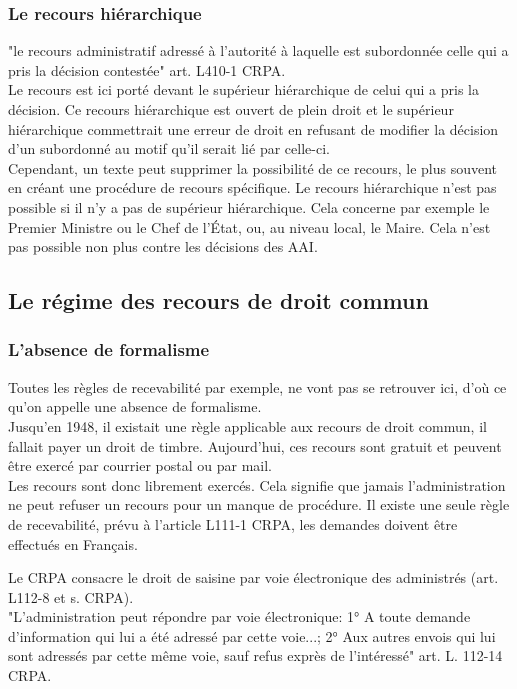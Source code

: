 \documentclass[10pt, a4paper, openany]{book}
\begin{document}
\subsubsection{Le recours hiérarchique}

"le recours administratif adressé à l'autorité à laquelle est subordonnée celle qui a pris la décision contestée" art. L410-1 CRPA. \\
Le recours est ici porté devant le supérieur hiérarchique de celui qui a pris la décision. Ce recours hiérarchique est ouvert de plein droit et le supérieur hiérarchique commettrait une erreur de droit en refusant de modifier la décision d'un subordonné au motif qu'il serait lié par celle-ci. \\
Cependant, un texte peut supprimer la possibilité de ce recours, le plus souvent en créant une procédure de recours spécifique. Le recours hiérarchique n'est pas possible si il n'y a pas de supérieur hiérarchique. Cela concerne par exemple le Premier Ministre ou le Chef de l'État, ou, au niveau local, le Maire. Cela n'est pas possible non plus contre les décisions des AAI. 

\subsection{Le régime des recours de droit commun}

\subsubsection{L'absence de formalisme}

Toutes les règles de recevabilité par exemple, ne vont pas se retrouver ici, d'où ce qu'on appelle une absence de formalisme. \\
Jusqu'en 1948, il existait une règle applicable aux recours de droit commun, il fallait payer un droit de timbre. Aujourd'hui, ces recours sont gratuit et peuvent être exercé par courrier postal ou par mail. \\
Les recours sont donc librement exercés. Cela signifie que jamais l'administration ne peut refuser un recours pour un manque de procédure. Il existe une seule règle de recevabilité, prévu à l'article L111-1 CRPA, les demandes doivent être effectués en Français.


Le CRPA consacre le droit de saisine par voie électronique des administrés (art. L112-8 et s. CRPA). \\
 "L'administration peut répondre par voie électronique: 1° A toute demande d'information qui lui a été adressé par cette voie...; 2° Aux autres envois qui lui sont adressés par cette même voie, sauf refus exprès de l'intéressé" art. L. 112-14 CRPA. 
\end{document}
